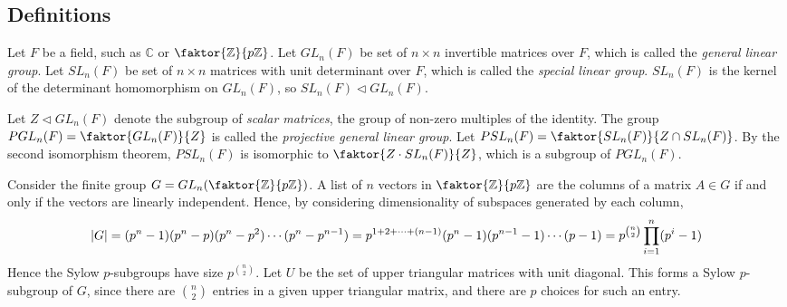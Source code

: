 \subsection{Definitions}
\begin{definition}
	Let \( F \) be a field, such as \( \mathbb C \) or \( \faktor{\mathbb Z}{p \mathbb Z} \).
	Let \( GL_n(F) \) be set of \( n \times n \) invertible matrices over \( F \), which is called the \textit{general linear group}.
	Let \( SL_n(F) \) be set of \( n \times n \) matrices with unit determinant over \( F \), which is called the \textit{special linear group}.
	\( SL_n(F) \) is the kernel of the determinant homomorphism on \( GL_n(F) \), so \( SL_n(F) \triangleleft GL_n(F) \).

	Let \( Z \triangleleft GL_n(F) \) denote the subgroup of \textit{scalar matrices}, the group of non-zero multiples of the identity.
	The group \( PGL_n(F) = \faktor{GL_n(F)}{Z} \) is called the \textit{projective general linear group}.
	Let \( PSL_n(F) = \faktor{SL_n(F)}{Z \cap SL_n(F)} \).
	By the second isomorphism theorem, \( PSL_n(F) \) is isomorphic to \( \faktor{Z \cdot SL_n(F)}{Z} \), which is a subgroup of \( PGL_n(F) \).
\end{definition}
\begin{example}
	Consider the finite group \( G = GL_n\qty(\faktor{\mathbb Z}{p\mathbb Z}) \).
	A list of \( n \) vectors in \( \faktor{\mathbb Z}{p\mathbb Z} \) are the columns of a matrix \( A \in G \) if and only if the vectors are linearly independent.
	Hence, by considering dimensionality of subspaces generated by each column,
	\[ \abs{G} = (p^n - 1)(p^n - p)(p^n - p^2) \cdots (p^n - p^{n-1}) = p^{1+2+\dots+(n-1)} (p^n - 1)(p^{n-1} - 1) \cdots (p - 1) = p^{\binom{n}{2}} \prod_{i=1}^n (p^i - 1) \]
	Hence the Sylow \( p \)-subgroups have size \( p^{\binom{n}{2}} \).
	Let \( U \) be the set of upper triangular matrices with unit diagonal.
	This forms a Sylow \( p \)-subgroup of \( G \), since there are \( \binom{n}{2} \) entries in a given upper triangular matrix, and there are \( p \) choices for such an entry.
\end{example}

